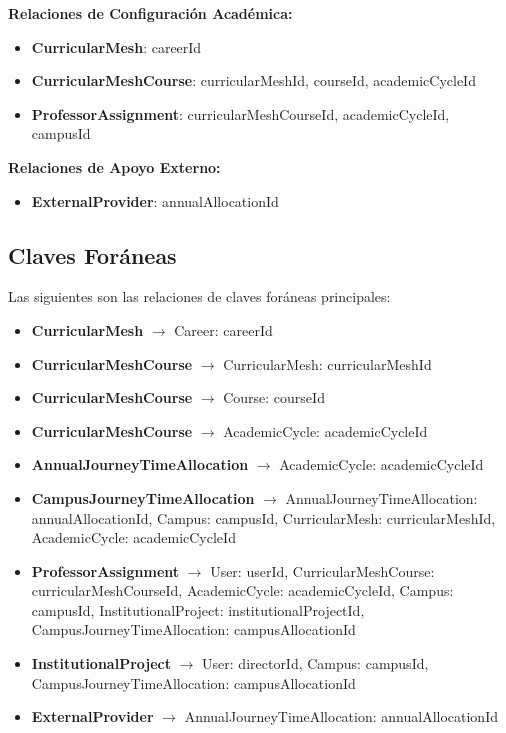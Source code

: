 \documentclass[11pt,a4paper]{article}
\begin{document}
\textbf{Relaciones de Configuración Académica:}
\begin{itemize}
    \item \textbf{CurricularMesh}: careerId
    \item \textbf{CurricularMeshCourse}: curricularMeshId, courseId, academicCycleId
    \item \textbf{ProfessorAssignment}: curricularMeshCourseId, academicCycleId, campusId
\end{itemize}

\textbf{Relaciones de Apoyo Externo:}
\begin{itemize}
    \item \textbf{ExternalProvider}: annualAllocationId
\end{itemize}

\subsection{Claves Foráneas}

Las siguientes son las relaciones de claves foráneas principales:

\begin{itemize}
    \item \textbf{CurricularMesh} $\rightarrow$ Career: careerId
    \item \textbf{CurricularMeshCourse} $\rightarrow$ CurricularMesh: curricularMeshId
    \item \textbf{CurricularMeshCourse} $\rightarrow$ Course: courseId
    \item \textbf{CurricularMeshCourse} $\rightarrow$ AcademicCycle: academicCycleId
    \item \textbf{AnnualJourneyTimeAllocation} $\rightarrow$ AcademicCycle: academicCycleId
    \item \textbf{CampusJourneyTimeAllocation} $\rightarrow$ AnnualJourneyTimeAllocation: annualAllocationId, Campus: campusId, CurricularMesh: curricularMeshId, AcademicCycle: academicCycleId
    \item \textbf{ProfessorAssignment} $\rightarrow$ User: userId, CurricularMeshCourse: curricularMeshCourseId, AcademicCycle: academicCycleId, Campus: campusId, InstitutionalProject: institutionalProjectId, CampusJourneyTimeAllocation: campusAllocationId
    \item \textbf{InstitutionalProject} $\rightarrow$ User: directorId, Campus: campusId, CampusJourneyTimeAllocation: campusAllocationId
    \item \textbf{ExternalProvider} $\rightarrow$ AnnualJourneyTimeAllocation: annualAllocationId
\end{itemize}
\end{document}

